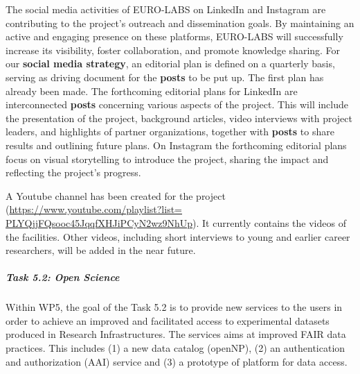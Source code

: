 \begin{description}
The social media activities of EURO-LABS on LinkedIn and Instagram are contributing to the project's outreach and dissemination goals. 
By maintaining an active and engaging presence on these platforms, EURO-LABS will successfully increase its visibility, foster collaboration, and promote knowledge sharing. For our \textbf{social media strategy}, an editorial plan is defined on a quarterly basis, serving as driving document for the \textbf{posts} to be put up. The first plan has already been made. The forthcoming editorial plans for LinkedIn are interconnected \textbf{posts} concerning various aspects of the project. This will include the presentation of the project, background articles, video interviews with project leaders, and highlights of partner organizations, together with \textbf{posts} to share results and outlining future plans. On Instagram the forthcoming editorial plans focus on visual storytelling to introduce the project, sharing the impact and reflecting the project's progress.  

A Youtube channel has been created for the project (\url{https://www.youtube.com/playlist?list= PLYQjjFQsooc45JqqfXHJiPCyN2wz9NhUp}). It currently contains the videos of the facilities.  Other videos, including short interviews to young and earlier career researchers, will be added in the near future.

\end{description}





\subparagraph{Task 5.2: Open Science } \mbox{}

Within WP5, the goal of the Task 5.2 is to provide new services to the users in order to achieve an improved and facilitated access to experimental datasets produced in Research Infrastructures. The services aims at improved FAIR data practices. This includes (1) a new data catalog (openNP), (2) an 
authentication and authorization (AAI) service and (3) a prototype of platform for data access.

